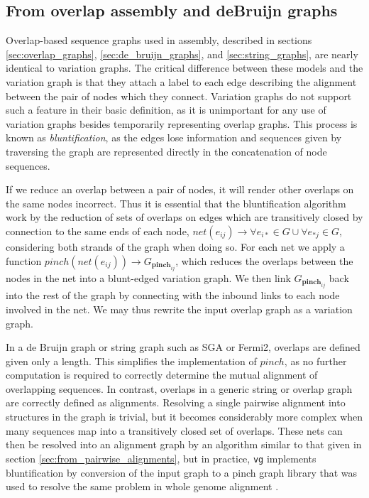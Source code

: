 \subsection{From overlap assembly and deBruijn graphs}

Overlap-based sequence graphs used in assembly, described in sections \ref{sec:overlap_graphs}, \ref{sec:de_bruijn_graphs}, and \ref{sec:string_graphs}, are nearly identical to variation graphs.
The critical difference between these models and the variation graph is that they attach a label to each edge describing the alignment between the pair of nodes which they connect.
Variation graphs do not support such a feature in their basic definition, as it is unimportant for any use of variation graphs besides temporarily representing overlap graphs.
This process is known as \emph{bluntification}, as the edges lose information and sequences given by traversing the graph are represented directly in the concatenation of node sequences.

If we reduce an overlap between a pair of nodes, it will render other overlaps on the same nodes incorrect.
Thus it is essential that the bluntification algorithm work by the reduction of sets of overlaps on edges which are transitively closed by connection to the same ends of each node, $net(e_{ij}) \to \forall e_{i*} \in G \cup \forall e_{*j} \in G$, considering both strands of the graph when doing so.
For each net we apply a function $pinch(net(e_{ij})) \to G_{\textbf{pinch}_{ij}}$, which reduces the overlaps between the nodes in the net into a blunt-edged variation graph.
We then link $G_{\textbf{pinch}_{ij}}$ back into the rest of the graph by connecting with the inbound links to each node involved in the net.
We may thus rewrite the input overlap graph as a variation graph.

In a de Bruijn graph or string graph such as SGA or Fermi2, overlaps are defined given only a length.
This simplifies the implementation of $pinch$, as no further computation is required to correctly determine the mutual alignment of overlapping sequences.
In contrast, overlaps in a generic string or overlap graph are correctly defined as alignments.
Resolving a single pairwise alignment into structures in the graph is trivial, but it becomes considerably more complex when many sequences map into a transitively closed set of overlaps.
These nets can then be resolved into an alignment graph by an algorithm similar to that given in section \ref{sec:from_pairwise_alignments}, but in practice, {\tt vg} implements bluntification by conversion of the input graph to a pinch graph library that was used to resolve the same problem in whole genome alignment \cite{Paten:2011fva}.

